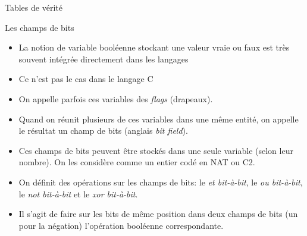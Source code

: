 \begin{exercice}
\begin{exercicelet}{Tables de vérité}
  \end{exercicelet}
\end{exercice}
\begin{frame}{Les champs de bits}
  \begin{itemize}
  \item La notion de variable booléenne stockant une valeur vraie ou faux
    est très souvent intégrée directement dans les langages
  \item[\dialogerror] Ce n'est pas le cas dans le langage C
  \item On appelle parfois ces variables des \emph{flags} (drapeaux).
  \item Quand on réunit plusieurs de ces variables dans une même entité, on
    appelle le résultat un champ de bits (anglais \emph{bit field}).
  \item Ces champs de bits peuvent être stockés dans une seule variable
    (selon leur nombre). On les considère comme un entier codé en NAT ou C2.
  \item On définit des opérations sur les champs de bits: le \emph{et
      bit-à-bit}, le \emph{ou bit-à-bit}, le \emph{not bit-à-bit} et le
    \emph{xor bit-à-bit}.
  \item[\dialogsystem] Il s'agit de faire sur les bits de même position dans
    deux champs de bits (un pour la négation) l'opération booléenne
    correspondante.
  \end{itemize}
\end{frame}
